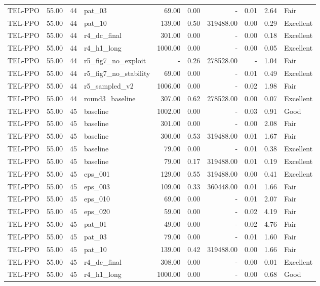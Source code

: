 \begin{table}[htbp]
\begin{tabular}{lrrlrrrrrl}
TEL-PPO & 55.00 & 44 & pat_03 & 69.00 & 0.00 & - & 0.01 & 2.64 & Fair \\
TEL-PPO & 55.00 & 44 & pat_10 & 139.00 & 0.50 & 319488.00 & 0.00 & 0.29 & Excellent \\
TEL-PPO & 55.00 & 44 & r4_dc_final & 301.00 & 0.00 & - & 0.00 & 0.18 & Excellent \\
TEL-PPO & 55.00 & 44 & r4_h1_long & 1000.00 & 0.00 & - & 0.00 & 0.05 & Excellent \\
TEL-PPO & 55.00 & 44 & r5_fig7_no_exploit & - & 0.26 & 278528.00 & - & 1.04 & Fair \\
TEL-PPO & 55.00 & 44 & r5_fig7_no_stability & 69.00 & 0.00 & - & 0.01 & 0.49 & Excellent \\
TEL-PPO & 55.00 & 44 & r5_sampled_v2 & 1006.00 & 0.00 & - & 0.02 & 1.98 & Fair \\
TEL-PPO & 55.00 & 44 & round3_baseline & 307.00 & 0.62 & 278528.00 & 0.00 & 0.07 & Excellent \\
TEL-PPO & 55.00 & 45 & baseline & 1002.00 & 0.00 & - & 0.03 & 0.91 & Good \\
TEL-PPO & 55.00 & 45 & baseline & 301.00 & 0.00 & - & 0.00 & 2.08 & Fair \\
TEL-PPO & 55.00 & 45 & baseline & 300.00 & 0.53 & 319488.00 & 0.01 & 1.67 & Fair \\
TEL-PPO & 55.00 & 45 & baseline & 79.00 & 0.00 & - & 0.01 & 0.38 & Excellent \\
TEL-PPO & 55.00 & 45 & baseline & 79.00 & 0.17 & 319488.00 & 0.01 & 0.19 & Excellent \\
TEL-PPO & 55.00 & 45 & eps_001 & 129.00 & 0.55 & 319488.00 & 0.00 & 0.41 & Excellent \\
TEL-PPO & 55.00 & 45 & eps_003 & 109.00 & 0.33 & 360448.00 & 0.01 & 1.66 & Fair \\
TEL-PPO & 55.00 & 45 & eps_010 & 69.00 & 0.00 & - & 0.01 & 2.07 & Fair \\
TEL-PPO & 55.00 & 45 & eps_020 & 59.00 & 0.00 & - & 0.02 & 4.19 & Fair \\
TEL-PPO & 55.00 & 45 & pat_01 & 49.00 & 0.00 & - & 0.02 & 4.76 & Fair \\
TEL-PPO & 55.00 & 45 & pat_03 & 79.00 & 0.00 & - & 0.01 & 1.60 & Fair \\
TEL-PPO & 55.00 & 45 & pat_10 & 139.00 & 0.42 & 319488.00 & 0.00 & 1.66 & Fair \\
TEL-PPO & 55.00 & 45 & r4_dc_final & 308.00 & 0.00 & - & 0.00 & 0.01 & Excellent \\
TEL-PPO & 55.00 & 45 & r4_h1_long & 1000.00 & 0.00 & - & 0.00 & 0.68 & Good \\

\end{tabular}
\end{table}
